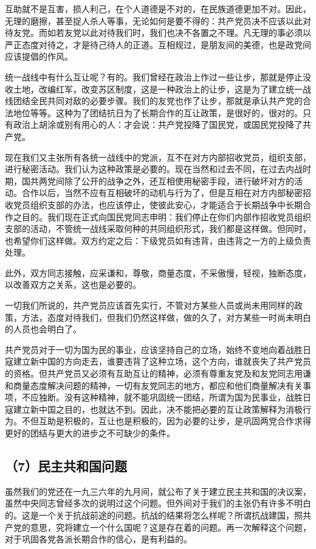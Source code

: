 互助就不是互害，损人利己，在个人道德是不对的，在民族道德更加不对。因此，无理的磨擦，甚至捉人杀人等事，无论如何是要不得的：共产党员决不应该以此对待友党。而如若友党以此对待我们时，我们也决不各置之不理。凡无理的事必须以严正态度对待之，才是待己待人的正道。互相规过，是朋友间的美德，也是政党间应该提倡的作风。

统一战线中有什么互让呢？有的。我们曾经在政治上作过一些让步，那就是停止没收土地，改编红军，改变苏区制度，这是一种政治上的让步，这是为了建立统一战线团结全民共同对敌的必要步骤。我们的友党也作了让步，那就是承认共产党的合法地位等等。这种为了团结抗日为了长期合作的互让政策，是很好的，很对的。只有政治上胡涂或别有用心的人：才会说：共产党投降了国民党，或国民党投降了共产党。

现在我们又主张所有各统一战线中的党派，互不在对方内部招收党员，组织支部，进行秘密活动。我们认为这种政策是必要的。现在当然和过去不同，在过去内战时期，国共两党间除了公开的战争之外，还互相使用秘密手段，进行破坏对方的活动。合作以后，当然不应有互相破坏的动机与行为了，但是互相在对方内部秘密招收党员组织支部的办法，也应该停止，使彼此安心，才能适合于长期战争中长期合作之目的。我们现在正式向国民党同志申明：我们停止在你们内部作招收党员组织支部的活动，不管统一战线采取何种的共同组织形式，我们都是这样做。但同时，也希望你们这样做。双方约定之后：下级党员如有违背，由违背之一方的上级负责处理。

此外，双方同志接触，应采谦和，尊敬，商量态度，不采傲慢，轻视，独断态度，以改善双方之关系，这也是必要的。

一切我们所说的，共产党员应该首先实行，不管对方某些人员或尚未用同样的政策，方法，态度对待我们，但我们仍然这样做，做的久了，对方某些一时尚未明白的人员也会明白了。

共产党员对于一切为国为民的事业，应该坚持自己的立场，始终不变地向着战胜日寇建立新中国的方向走去，谁要违背了这种立场，这个方向，谁就丧失了共产党员的资格。但共产党员又必须有互助互让的精神，必须有尊重友党及和友党同志用谦和商量态度解决问题的精神，一切有友党同志的地方，都应和他们商量解决有关事项，不应独断。没有这种精神，就不能巩固统一团结，所谓为国为民事业，战胜日寇建立新中国之目的，也就达不到。因此，决不能把必要的互让政策解释为消极行为。不但互助是积极的，互让也是积极的，因为必要的让步，是巩固两党合作求得更好的团结与更大的进步之不可缺少的条件。

\subsection{（7）民主共和国问题}

虽然我们的党还在一九三六年的九月间，就公布了关于建立民主共和国的决议案，虽然中央同志曾经多次的说明过这个问题。但外间对于我们的主张仍有许多不明白的。这是一个关于抗战前途的问题。抗战的结果将怎么样呢？所谓抗战建国，照共产党的意思，究将建立一个什么国呢？这是存在着的问题。再一次解释这个问题，对于巩固各党各派长期合作的信心，是有利益的。

